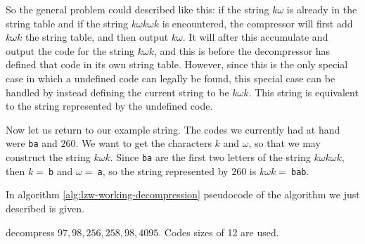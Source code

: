 \newcommand{\ko}{\ensuremath{k\omega}\xspace}
\newcommand{\kok}{\ensuremath{k\omega{}k}\xspace}
\newcommand{\kokok}{\ensuremath{k\omega{}k \omega{} k}\xspace}

So the general problem could described like this\cite{welch85:_u}: if
the string \ko is already in the string table and if the string \kokok
is encountered, the compressor will first add \kok the string table,
and then output \ko. It will after this accumulate and output the code
for the string \kok, and this is before the decompressor has defined
that code in its own string table. However, since this is the only
special case in which a undefined code can legally be found, this
special case can be handled by instead defining the current string to
be $\kok$. This string is equivalent to the string represented by the
undefined code.

Now let us return to our example string. The codes we currently had at
hand were \texttt{ba} and $260$. We want to get the characters $k$ and
$\omega$, so that we may construct the string $\kok$. Since
\texttt{ba} are the first two letters of the string $\kokok$, then $k
=\ $\texttt{b} and $\omega =\ $\texttt{a}, so the string represented
by $260$ is $\kok =\ $\texttt{bab}.

In algorithm \ref{alg:lzw-working-decompression} pseudocode of the
algorithm we just described is given.

\begin{Exercise}[label={lzw-decompress}]

  \lzw decompress $97,98,256,258,98,4095$. Codes sizes of 12 are used.

\end{Exercise}



